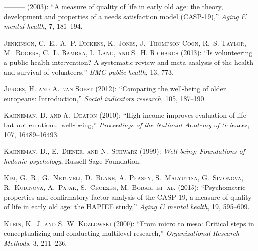 \documentclass[10pt, letterpaper]{article}
\begin{document}
\begin{spacing}{1.4}
\begin{thebibliography}{91}
---\hspace{-.1pt}---\hspace{-.1pt}--- (2003{}): \enquote{A measure
  of quality of life in early old age: the theory, development and properties
  of a needs satisfaction model (CASP-19),} \emph{Aging \& mental health}, 7,
  186--194.

\textsc{Jenkinson, C.~E., A.~P. Dickens, K.~Jones, J.~Thompson-Coon, R.~S.
  Taylor, M.~Rogers, C.~L. Bambra, I.~Lang, and S.~H. Richards} (2013):
  \enquote{Is volunteering a public health intervention? A systematic review
  and meta-analysis of the health and survival of volunteers,} \emph{BMC public
  health}, 13, 773.

\textsc{J{\"u}rges, H. and A.~van Soest} (2012): \enquote{Comparing the
  well-being of older europeans: Introduction,} \emph{Social indicators
  research}, 105, 187--190.

\textsc{Kahneman, D. and A.~Deaton} (2010): \enquote{High income improves
  evaluation of life but not emotional well-being,} \emph{Proceedings of the
  National Academy of Sciences}, 107, 16489--16493.

\textsc{Kahneman, D., E.~Diener, and N.~Schwarz} (1999): \emph{Well-being:
  Foundations of hedonic psychology}, Russell Sage Foundation.

\textsc{Kim, G.~R., G.~Netuveli, D.~Blane, A.~Peasey, S.~Malyutina,
  G.~Simonova, R.~Kubinova, A.~Pajak, S.~Croezen, M.~Bobak, et~al.} (2015):
  \enquote{Psychometric properties and confirmatory factor analysis of the
  CASP-19, a measure of quality of life in early old age: the HAPIEE study,}
  \emph{Aging \& mental health}, 19, 595--609.

\textsc{Klein, K.~J. and S.~W. Kozlowski} (2000): \enquote{From micro to meso:
  Critical steps in conceptualizing and conducting multilevel research,}
  \emph{Organizational Research Methods}, 3, 211--236.


\end{thebibliography}
\end{spacing}
\end{document}
